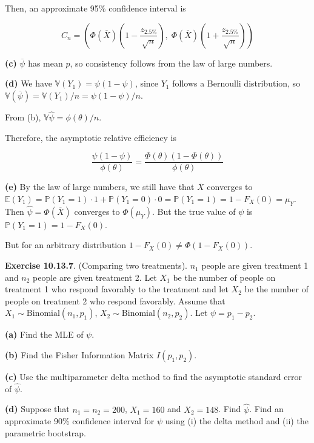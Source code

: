 Then, an approximate 95\% confidence interval is

\[ C_{n} = \left(\Phi(\overline{X}) \left(1 - \frac{z_{2.5\%}}{\sqrt{n}}\right), \; 
\Phi(\overline{X}) \left(1 + \frac{z_{2.5\%}}{\sqrt{n}}\right) \right)\]

\textbf{(c)} \(\overline{\psi}\) has mean \(p\), so consistency follows
from the law of large numbers.

\textbf{(d)} We have \(\mathbb{V}(Y_{1}) = \psi (1 - \psi)\), since
\(Y_{1}\) follows a Bernoulli distribution, so
\(\mathbb{V}(\overline{\psi}) = \mathbb{V}(Y_{1}) / n = \psi (1 - \psi) / n\).

From (b), \(\mathbb{V}{\hat{\psi}} = \phi(\theta) / n\).

Therefore, the asymptotic relative efficiency is

\[\frac{\psi(1 - \psi)}{\phi(\theta)} = \frac{\Phi(\theta)(1 - \Phi(\theta))}{\phi(\theta)}\]

\textbf{(e)} By the law of large numbers, we still have that
\(\overline{X}\) converges to
\(\mathbb{E}(Y_{1}) = \mathbb{P}(Y_{1} = 1) \cdot 1 + \mathbb{P}(Y_{1} = 0)\cdot 0 = \mathbb{P}(Y_{1} = 1) = 1 - F_X(0) = \mu_Y\).
Then \(\hat{\psi} = \Phi(\overline{X})\) converges to \(\Phi(\mu_Y)\).
But the true value of \(\psi\) is \(\mathbb{P}(Y_{1} = 1) = 1 - F_X(0)\).

But for an arbitrary distribution \(1 - F_X(0) \neq \Phi(1 - F_X(0))\).

\textbf{Exercise 10.13.7}. (Comparing two treatments). \(n_{1}\) people
are given treatment 1 and \(n_{2}\) people are given treatment 2. Let
\(X_{1}\) be the number of people on treatment 1 who respond favorably to
the treatment and let \(X_{2}\) be the number of people on treatment 2 who
respond favorably. Assume that \(X_{1} \sim \text{Binomial}(n_{1}, p_{1})\),
\(X_{2} \sim \text{Binomial}(n_{2}, p_{2})\). Let \(\psi = p_{1} - p_{2}\).

\textbf{(a)} Find the MLE of \(\psi\).

\textbf{(b)} Find the Fisher Information Matrix \(I(p_{1}, p_{2})\).

\textbf{(c)} Use the multiparameter delta method to find the asymptotic
standard error of \(\hat{\psi}\).

\textbf{(d)} Suppose that \(n_{1} = n_{2} = 200\), \(X_{1} = 160\) and
\(X_{2} = 148\). Find \(\hat{\psi}\). Find an approximate 90\% confidence
interval for \(\psi\) using (i) the delta method and (ii) the parametric
bootstrap.

